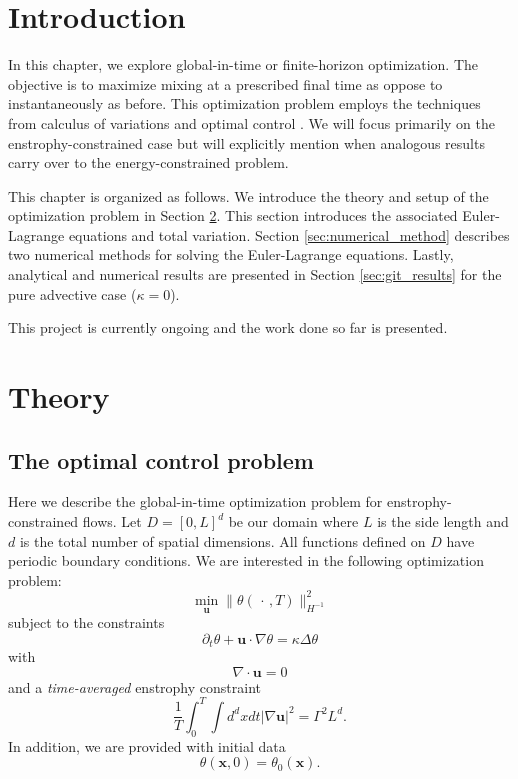 
\section{Introduction}

In this chapter,  we explore global-in-time or finite-horizon optimization. The objective is to maximize mixing  at a prescribed final time as oppose to instantaneously as before.  This optimization problem employs the techniques from calculus of variations and optimal control \cite{Kirk2004a, gelfand2000calculus, fox1950introduction,troltzsch2010optimal, bertsekas1995dynamic,liberzon2011calculus}. We will focus primarily on the enstrophy-constrained case but will explicitly mention when analogous results carry over to the energy-constrained problem.

This chapter is organized as follows. We introduce the theory and setup of the optimization problem in Section \ref{sec:git_theory}. This section introduces the associated Euler-Lagrange equations and total variation. Section \ref{sec:numerical_method} describes two numerical methods for solving the Euler-Lagrange equations. Lastly, analytical and numerical results are presented in Section \ref{sec:git_results} for the pure advective case ($\kappa = 0$).

This project is currently ongoing and the work done so far is presented. 
\section{Theory}
\label{sec:git_theory}
\subsection{The optimal control problem}
Here we describe the global-in-time optimization problem for enstrophy-constrained flows. Let $D=[0,L]^{d}$ be our domain where $L$ is the side length and $d$ is the total number of spatial dimensions. All functions defined on $D$ have periodic boundary conditions. We are interested in the following optimization problem:
\begin{equation}
	\label{eq:PDE_GIT}
	\min_{\mathbf{u}} \|\theta(\,\cdot\,,T)\|_{H^{-1}}^{2}
\end{equation}
subject to the constraints
\begin{equation}
	\label{eq:PDE_advection2-git}
	\partial_{t}\theta+\mathbf{u}\cdot \nabla \theta= \kappa \Delta \theta
\end{equation}
with 
\begin{equation}
\label{eq:PDE_divfree2-git}
\nabla \cdot \mathbf{u} = 0
\end{equation}
and a {\it time-averaged} enstrophy constraint
\begin{equation}
	\label{eq:PDE_enstrophy-git}
	\frac{1}{T}\int_{0}^{T}\int d^{d}x dt |\nabla\mathbf{u}|^{2} = \Gamma^2 L^{d}.
\end{equation}
In addition, we are provided with initial data
\begin{equation}
	\label{eq:PDE_initial_condition2-git}
	\theta(\mathbf{x},0)=\theta_{0}(\mathbf{x}).
\end{equation}
%
